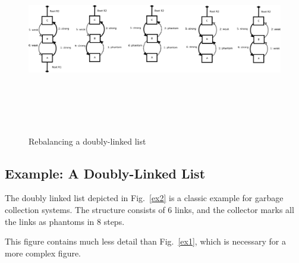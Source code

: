 \begin{figure}[!t]
  \centering
  {\includegraphics[height=3.0in]{figs/recoveringdbl}}%

  \caption{Rebalancing a doubly-linked list}%
  \label{ex3}
\end{figure}


\subsection{Example: A Doubly-Linked List}

The doubly linked list depicted in Fig.~\ref{ex2} is a classic
example for garbage collection systems. The structure consists of
6 links, and the collector marks all the links as phantoms in 8
steps.

This figure contains much less detail than Fig.~\ref{ex1}, which
is necessary for a more complex figure.



